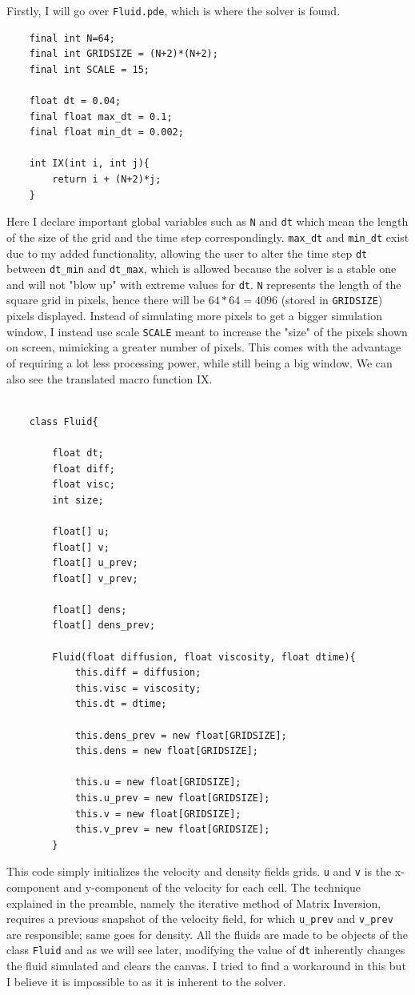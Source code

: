 \documentclass[12pt,a4paper]{book}
\begin{document}
Firstly, I will go over \verb|Fluid.pde|, which is where the solver is found. 
\begin{lstlisting}
	final int N=64;
	final int GRIDSIZE = (N+2)*(N+2);
	final int SCALE = 15;
	
	float dt = 0.04;
	final float max_dt = 0.1;
	final float min_dt = 0.002;
	
	int IX(int i, int j){
		return i + (N+2)*j; 
	}
\end{lstlisting}
Here I declare important global variables such as \verb|N| and \verb|dt| which mean the length of the size of the grid and the time step correspondingly. \verb|max_dt| and \verb|min_dt| exist due to my added functionality, allowing the user to alter the time step \verb|dt| between \verb|dt_min| and \verb|dt_max|, which is allowed because the solver is a stable one and will not "blow up" with extreme values for \verb|dt|. \verb|N| represents the length of the square grid in pixels, hence there will be $ 64*64= 4096$ (stored in \verb|GRIDSIZE|) pixels displayed. Instead of simulating more pixels to get a bigger simulation window, I instead use scale \verb|SCALE| meant to increase the "size" of the pixels shown on screen, mimicking a greater number of pixels. This comes with the advantage of requiring a lot less processing power, while still being a big window. We can also see the translated macro function IX.\\
\\
\begin{lstlisting}
	class Fluid{
		
		float dt;
		float diff;
		float visc;
		int size;
		
		float[] u;
		float[] v;
		float[] u_prev;
		float[] v_prev;
		
		float[] dens;
		float[] dens_prev;
		
		Fluid(float diffusion, float viscosity, float dtime){
			this.diff = diffusion;
			this.visc = viscosity;
			this.dt = dtime;
			
			this.dens_prev = new float[GRIDSIZE];
			this.dens = new float[GRIDSIZE];
			
			this.u = new float[GRIDSIZE];
			this.u_prev = new float[GRIDSIZE];
			this.v = new float[GRIDSIZE];
			this.v_prev = new float[GRIDSIZE];
		}
\end{lstlisting}
This code simply initializes the velocity and density fields grids. \verb|u| and \verb|v| is the x-component and y-component of the velocity for each cell. The technique explained in the preamble, namely the iterative method of Matrix Inversion, requires a previous snapshot of the velocity field, for which \verb|u_prev| and \verb|v_prev| are responsible; same goes for density. All the fluids are made to be objects of the class \verb|Fluid| and as we will see later, modifying the value of \verb|dt| inherently changes the fluid simulated and clears the canvas. I tried to find a workaround in this but I believe it is impossible to as it is inherent to the solver.
\end{document}
